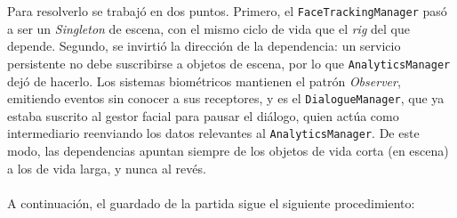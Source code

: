 \documentclass[12pt,twoside,titlepage]{report}
\begin{document}
Para resolverlo se trabajó en dos puntos. Primero, el \texttt{FaceTrackingManager} pasó a ser un \textit{Singleton} de escena, con el mismo ciclo de vida que el \textit{rig} del que depende. Segundo, se invirtió la dirección de la dependencia: un servicio persistente no debe suscribirse a objetos de escena, por lo que \texttt{AnalyticsManager} dejó de hacerlo.
Los sistemas biométricos mantienen el patrón \textit{Observer}, emitiendo eventos sin conocer a sus receptores, y es el \texttt{DialogueManager}, que ya estaba suscrito al gestor facial para pausar el diálogo, quien actúa como intermediario reenviando los datos relevantes al \texttt{AnalyticsManager}. De este modo, las dependencias apuntan siempre de los objetos de vida corta (en escena) a los de vida larga, y nunca al revés.
\\\\
A continuación, el guardado de la partida sigue el siguiente procedimiento:
\end{document}
